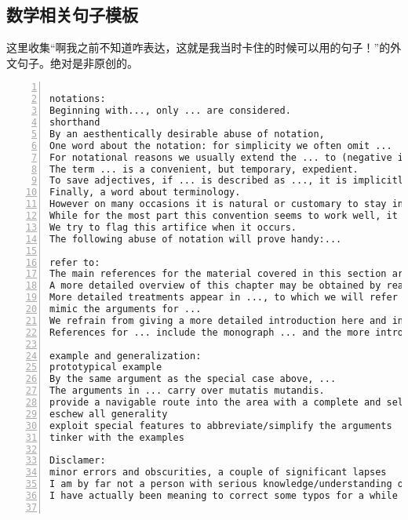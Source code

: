 \documentclass[11pt]{amsart}
\begin{document}
\subsection{数学相关句子模板}
这里收集“啊我之前不知道咋表达，这就是我当时卡住的时候可以用的句子！”的外文句子。绝对是非原创的。
\begin{lstlisting}[numbers=left,numberstyle=\tiny,numbersep=10pt]

notations:
Beginning with..., only ... are considered.
shorthand
By an aesthentically desirable abuse of notation, 
One word about the notation: for simplicity we often omit ...
For notational reasons we usually extend the ... to (negative indices) by defining ...
The term ... is a convenient, but temporary, expedient.
To save adjectives, if ... is described as ..., it is implicitly assumed to be ...
Finally, a word about terminology.
However on many occasions it is natural or customary to stay in ... mode when nonetheless one has ... in mind.
While for the most part this convention seems to work well, it occasionally leads us to make extraneous ... hypotheses in order to invoke ...
We try to flag this artifice when it occurs.
The following abuse of notation will prove handy:...

refer to:
The main references for the material covered in this section are ...
A more detailed overview of this chapter may be obtained by reading the introductions to the various sections.
More detailed treatments appear in ..., to which we will refer for proofs.
mimic the arguments for ...
We refrain from giving a more detailed introduction here and instead refer the reader to the table of contents as well as to the short introductions of the individual sections.
References for ... include the monograph ... and the more introductory account ...

example and generalization:
prototypical example
By the same argument as the special case above, ...
The arguments in ... carry over mutatis mutandis.
provide a navigable route into the area with a complete and self-contained account of the case ...
eschew all generality
exploit special features to abbreviate/simplify the arguments
tinker with the examples

Disclamer:
minor errors and obscurities, a couple of significant lapses
I am by far not a person with serious knowledge/understanding of ..., thus in the ... I may oversimplify/overcomplicate things, be inaccurate, or even wrong, and miss subtelties.
I have actually been meaning to correct some typos for a while and so I will hopefully do all these corrections in the next few weeks.


\end{lstlisting}
\end{document}
